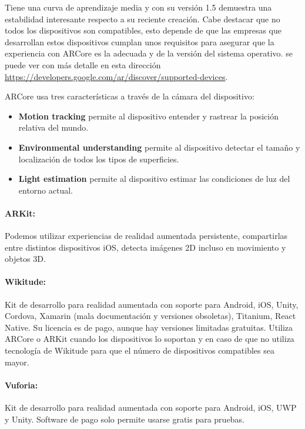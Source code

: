 Tiene una curva de aprendizaje media y con su versión 1.5 demuestra una
 estabilidad interesante respecto a su reciente creación. Cabe destacar
 que no todos los dispositivos son compatibles, esto depende de que las
 empresas que desarrollan estos dispositivos cumplan unos requisitos
 para asegurar que la experiencia con ARCore es la adecuada y de la
 versión del sistema operativo. se puede ver con más detalle en esta
 dirección \url{https://developers.google.com/ar/discover/supported-devices}.

ARCore usa tres características a través de la cámara del dispositivo:
 \begin{itemize}  
     \item {\bf Motion tracking} permite al dispositivo entender y rastrear la posición relativa del mundo.
     \item {\bf Environmental understanding} permite al dispositivo detectar el tamaño y localización de todos los tipos de superficies.
     \item {\bf Light estimation} permite al dispositivo estimar las condiciones de luz del entorno actual.
 \end{itemize}

\paragraph{ARKit:}
Podemos utilizar experiencias de realidad aumentada persistente, compartirlas entre distintos dispositivos iOS,
 detecta imágenes 2D incluso en movimiento y objetos 3D.

\paragraph{Wikitude:}
Kit de desarrollo para realidad aumentada con soporte para Android, iOS, Unity, Cordova, Xamarin (mala
 documentación y versiones obsoletas), Titanium, React Native.
Su licencia es de pago, aunque hay versiones limitadas gratuitas.
Utiliza ARCore o ARKit cuando los dispositivos lo soportan y en caso de que no utiliza tecnología de Wikitude
 para que el número de dispositivos compatibles sea mayor. 

\paragraph{Vuforia:}
Kit de desarrollo para realidad aumentada con soporte para Android, iOS, UWP y Unity.
Software de pago solo permite usarse gratis para pruebas.

